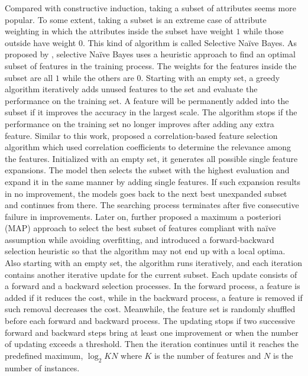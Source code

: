 \documentclass[twoside,11pt]{article}
\begin{document}
Compared with constructive induction, taking a subset of attributes seems more popular. To some extent, taking a subset is an extreme case of attribute weighting in which the attributes inside the subset have weight $1$ while those outside have weight $0$. This kind of algorithm is called Selective Na\"ive Bayes. As proposed by \citet{langley1994induction}, selective Na\"ive Bayes uses a heuristic approach to find an optimal subset of features in the training process. The weights for the features inside the subset are all $1$ while the others are $0$. Starting with an empty set, a greedy algorithm iteratively adds unused features to the set and evaluate the performance on the training set. A feature will be permanently added into the subset if it improves the accuracy in the largest scale. The algorithm stops if the performance on the training set no longer improves after adding any extra feature. Similar to this work, \citet{hall2000correlation} proposed a correlation-based feature selection algorithm which used correlation coefficients to determine the relevance among the features. Initialized with an empty set, it generates all possible single feature expansions. The model then selects the subset with the highest evaluation and expand it in the same manner by adding single features. If such expansion results in no improvement, the models goes back to the next best unexpanded subset and continues from there. The searching process terminates after five consecutive failure in improvements. Later on, \citet{boulle2007compression} further proposed a maximum a posteriori (MAP) approach to select the best subset of features compliant with na\"ive assumption while avoiding overfitting, and introduced a forward-backward selection heuristic so that the algorithm may not end up with a local optima. Also starting with an empty set, the algorithm runs iteratively, and each iteration contains another iterative update for the current subset. Each update consists of a forward and a backward selection processes. In the forward process, a feature is added if it reduces the cost, while in the backward process, a feature is removed if such removal decreases the cost. Meanwhile, the feature set is randomly shuffled before each forward and backward process. The updating stops if two successive forward and backward steps bring at least one improvement or when the number of updating exceeds a threshold. Then the iteration continues until it reaches the predefined maximum, $\log_2 KN$ where $K$ is the number of features and $N$ is the number of instances.
\end{document}
